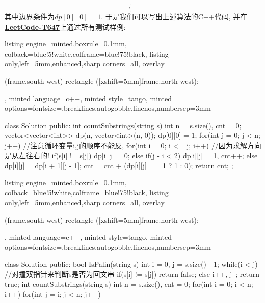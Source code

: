 \documentclass{article}
\begin{document}
\begin{homeworkProblem}
$$\begin{cases}
    \end{cases}
    $$
    其中边界条件为$dp[0][0]=1$. 于是我们可以写出上述算法的C++代码, 并在\href{https://leetcode.cn/problems/palindromic-substrings/description/}{\textbf{LeetCode-T647}}上通过所有测试样例:
\begin{tcblisting}{listing engine=minted,boxrule=0.1mm,
colback=blue!5!white,colframe=blue!75!black,
listing only,left=5mm,enhanced,sharp corners=all,
overlay={\begin{tcbclipinterior} (frame.south west)
rectangle ([xshift=5mm]frame.north west);\end{tcbclipinterior}},
minted language=c++,
minted style=tango,
minted options={fontsize=\small,breaklines,autogobble,linenos,numbersep=3mm}}
class Solution {
public:
    int countSubstrings(string s) {
        int n = s.size(), cnt = 0;
        vector<vector<int>> dp(n, vector<int>(n, 0));
        dp[0][0] = 1;
        for(int j = 0; j < n; j++) {  //注意循环变量i,j的顺序不能反,
            for(int i = 0; i <= j; i++) {  //因为求解方向是从左往右的!
                if(s[i] != s[j]) {
                    dp[i][j] = 0;
                }
                else {
                    if(j - i < 2) {
                        dp[i][j] = 1, cnt++;
                    }
                    else {
                        dp[i][j] = dp[i + 1][j - 1];
                        cnt = cnt + (dp[i][j] == 1 ? 1 : 0);
                    }
                }
            }
        }
        return cnt;
    }
};
\end{tcblisting}
\begin{tcblisting}{listing engine=minted,boxrule=0.1mm,
colback=blue!5!white,colframe=blue!75!black,
listing only,left=5mm,enhanced,sharp corners=all,
overlay={\begin{tcbclipinterior} (frame.south west)
rectangle ([xshift=5mm]frame.north west);\end{tcbclipinterior}},
minted language=c++,
minted style=tango,
minted options={fontsize=\small,breaklines,autogobble,linenos,numbersep=3mm}}
class Solution {
public:
    bool IsPalin(string s) {
        int i = 0, j = s.size() - 1;
        while(i < j) {  //对撞双指针来判断s是否为回文串
            if(s[i] != s[j]) {
                return false;
            }
            else {
                i++, j--;
            }
        }
        return true;
    }
    int countSubstrings(string s) {
        int n = s.size(), cnt = 0;
        for(int i = 0; i < n; i++) {
            for(int j = i; j < n; j++) {
}}}}
\end{tcblisting}
\end{homeworkProblem}
\end{document}
